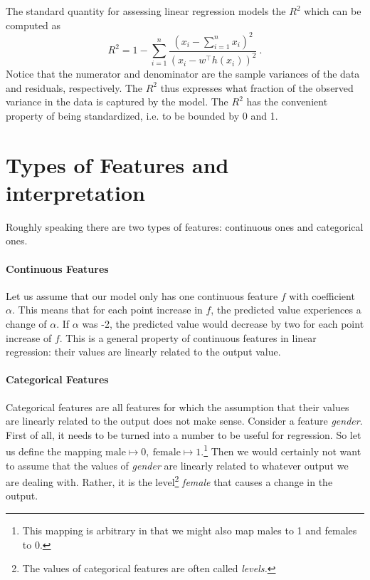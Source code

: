 \documentclass[11pt, leqno, a4paper]{article}
\begin{document}
The standard quantity for assessing linear regression models the 
\href{https://en.wikipedia.org/wiki/Coefficient_of_determination}{$ R^{2} $} which can be computed as
\begin{equation}
R^{2} = 1 - \sum_{i=1}^{n} \frac{\left(x_{i} - \sum_{i = 1}^{n}x_{i}\right)^{2}}
{\left( x_{i} - w^{\top}h(x_{i}) \right)^{2}} \ .
\end{equation}
Notice that the numerator and denominator are the sample variances of the data and residuals, respectively.
The $ R^{2} $ thus expresses what fraction of the observed variance in the data is captured by the model. The 
$ R^{2} $ has the convenient property of being standardized, i.e. to be bounded by 0 and 1.

\section{Types of Features and interpretation}

Roughly speaking there are two types of features: continuous ones and categorical ones.

\paragraph{Continuous Features} Let us assume that our model only has one continuous feature $ f $ 
with coefficient $ \alpha $. This means that for each point increase in $ f $, the predicted value
experiences a change of $ \alpha $. If $ \alpha $ was -2, the predicted value would decrease by two
for each point increase of $ f $. This is a general property of continuous features in linear
regression: their values are linearly related to the output value.

\paragraph{Categorical Features} Categorical features are all features for which the assumption
that their values are linearly related to the output does not make sense. Consider a feature \textit{gender}.
First of all, it needs to be turned into a number to be useful for regression. So let us
define the mapping $ \text{male} \mapsto 0, \ \text{female} \mapsto 1 $.\footnote{This mapping
is arbitrary in that we might also map males to 1 and females to 0.} Then we would certainly not
want to assume that the values of \textit{gender} are linearly related to whatever output we are dealing
with. Rather, it is the level\footnote{The values of categorical features are often called \textit{levels.}}
\textit{female} that causes a change in the output.
\end{document}
